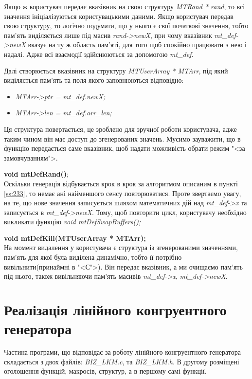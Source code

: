 \documentclass[oneside,final,14pt]{extreport}
\begin{document}
\begin{large}
Якщо ж користувач передає вказівник на свою структуру {\itshape MTRand * rand}, то всі значення 
ініціалізуються користувацькими даними. Якщо користувач передав свою структуру, 
то логічно подумати, що у нього є свої початкові значення, тобто пам'ять виділяється 
лише під масив {\itshape rand->newX}, при чому вказівник {\itshape mt\_def->newX} вказує на ту ж область пам'яті, 
для того щоб спокійно працювати з нею і надалі. Адже всі взаємодії здійснюються за допомогою {\itshape mt\_def}. 

Далі створюється вказівник на структуру {\itshape MTUserArray * MTArr}, під який виділяється 
пам'ять та поля якого заповнюються відповідно: 
\begin{itemize}
\item
{\itshape MTArr->ptr = \itshape mt\_def.newX;}
\item 
{\itshape MTArr->len = mt\_def.arr\_len;}
\end{itemize}

Ця структура повертається, це зроблено для зручної роботи користувача, адже таким 
чином він має доступ до згенерованих значень. Мусимо зауважити, що в функцію передається 
саме вказівник, щоб надати можливість обрати режим "<за замовчуванням">.

{\bfseries void mtDefRand()};\\
	Оскільки генерація відбувається крок в крок за алгоритмом описаним в пункті \ref{ss:233}, 
	то немає ані найменшого сенсу повторюватися. Проте звертаємо увагу, на те, що нове значення 
	записується шляхом математичних дій над {\itshape mt\_def->x} та записується в {\itshape mt\_def->newX}. 
	Тому, щоб повторити цикл, користувачу необхідно викликати функцію {\itshape void mtDefSwapBuffers();}

{\bfseries void mtDefKill(MTUserArray * MTArr);}\\
	На момент видалення у користувача є структура із згенерованими значеннями, 
	пам'ять для якої була виділена динамічно, тобто її потрібно вивільнити(принаймні в "<С">). 
	Він передає вказівник, а ми очищаємо пам'ять під нього, також вивільняючи пам'ять 
	масивів {\itshape mt\_def->x}, {\itshape mt\_def->newX}.
\section{Реалізація лінійного конгруентного генератора}\label{s:33}
Частина програми, що відповідає за роботу лінійного конгруентного генератора складається 
з двох файлів: {\itshape BIZ\_LKM.c}, та {\itshape BIZ\_LKM.h}. В другому розміщені оголошення функцій, макросів,
 структур, а в першому самі функції. 

\end{large}
\end{document}
